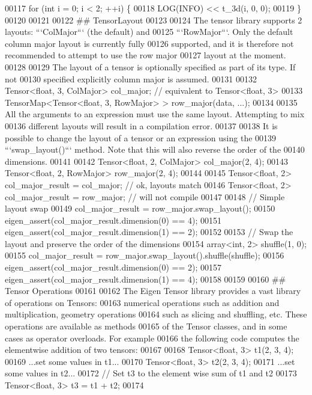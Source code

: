 \begin{DoxyCode}
00117     for (int i = 0; i < 2; ++i) \{
00118       LOG(INFO) << t\_3d(i, 0, 0);
00119     \}
00120 
00121 
00122 ## TensorLayout
00123 
00124 The tensor library supports 2 layouts: ```ColMajor``` (the default) and
00125 ```RowMajor```.  Only the default column major layout is currently fully
00126 supported, and it is therefore not recommended to attempt to use the row major
00127 layout at the moment.
00128 
00129 The layout of a tensor is optionally specified as part of its type. If not
00130 specified explicitly column major is assumed.
00131 
00132     Tensor<float, 3, ColMajor> col\_major;  // equivalent to Tensor<float, 3>
00133     TensorMap<Tensor<float, 3, RowMajor> > row\_major(data, ...);
00134 
00135 All the arguments to an expression must use the same layout. Attempting to mix
00136 different layouts will result in a compilation error.
00137 
00138 It is possible to change the layout of a tensor or an expression using the
00139 ```swap\_layout()``` method.  Note that this will also reverse the order of the
00140 dimensions.
00141 
00142     Tensor<float, 2, ColMajor> col\_major(2, 4);
00143     Tensor<float, 2, RowMajor> row\_major(2, 4);
00144 
00145     Tensor<float, 2> col\_major\_result = col\_major;  // ok, layouts match
00146     Tensor<float, 2> col\_major\_result = row\_major;  // will not compile
00147 
00148     // Simple layout swap
00149     col\_major\_result = row\_major.swap\_layout();
00150     eigen\_assert(col\_major\_result.dimension(0) == 4);
00151     eigen\_assert(col\_major\_result.dimension(1) == 2);
00152 
00153     // Swap the layout and preserve the order of the dimensions
00154     array<int, 2> shuffle(1, 0);
00155     col\_major\_result = row\_major.swap\_layout().shuffle(shuffle);
00156     eigen\_assert(col\_major\_result.dimension(0) == 2);
00157     eigen\_assert(col\_major\_result.dimension(1) == 4);
00158 
00159 
00160 ## Tensor Operations
00161 
00162 The Eigen Tensor library provides a vast library of operations on Tensors:
00163 numerical operations such as addition and multiplication, geometry operations
00164 such as slicing and shuffling, etc.  These operations are available as methods
00165 of the Tensor classes, and in some cases as operator overloads.  For example
00166 the following code computes the elementwise addition of two tensors:
00167 
00168     Tensor<float, 3> t1(2, 3, 4);
00169     ...set some values in t1...
00170     Tensor<float, 3> t2(2, 3, 4);
00171     ...set some values in t2...
00172     // Set t3 to the element wise sum of t1 and t2
00173     Tensor<float, 3> t3 = t1 + t2;
00174 

\end{DoxyCode}
